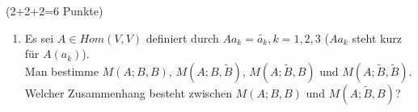 \documentclass{uebblatt}
\begin{document}
\begin{aufgabe}{ (2+2+2=6 Punkte)}
\begin{enumerate}
\item Es sei $A \in Hom(V, V)$ definiert durch $Aa_k = \tilde{a_k}, k = 1, 2, 3$ ($Aa_k$ steht kurz für $A(a_k)$). \\
Man bestimme $M(A; B, B)$, $M(A; B, \widetilde{B})$, $M(A; \widetilde{B}, B)$ und $M(A; \widetilde{B}, \widetilde{B})$. \\
Welcher Zusammenhang besteht zwischen $M(A; B, B)$ und $M(A; \widetilde{B}, B)$?
\end{enumerate}
\end{aufgabe}
\end{document}
